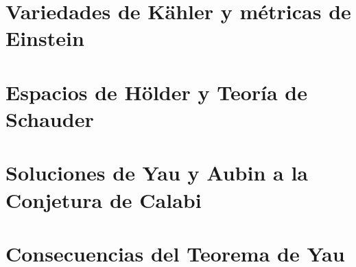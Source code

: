 \documentclass[10pt, twoside,letterpaper]{phstylee}
\begin{document}
\cleardoublepage

\chapter{Variedades de K\"ahler y m\'etricas de Einstein}\label{cap:cap1}




\cleardoublepage

\chapter{Espacios de H{\"o}lder y Teor\'ia de Schauder}\label{cap:cap2}




\cleardoublepage

\chapter{Soluciones de Yau y Aubin a la Conjetura de Calabi}\label{cap:cap3}




\cleardoublepage

\chapter{Consecuencias del Teorema de Yau}\label{cap:cap4}








%
%
\end{document}
